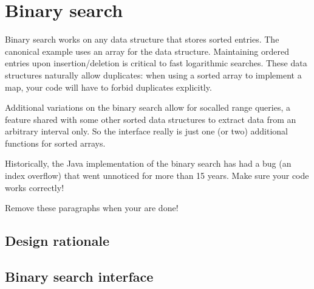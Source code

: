 \chapter{Binary search}\label{chap:binary:search}

Binary search works on any data structure that stores sorted entries. The canonical example uses an array for the data structure. Maintaining ordered entries upon insertion/deletion is critical to fast logarithmic searches. These data structures naturally allow duplicates: when using a sorted array to implement a map, your code will have to forbid duplicates explicitly.

Additional variations on the binary search allow for socalled range queries, a feature shared with some other sorted data structures to extract data from an arbitrary interval only. So the interface really is just one (or two) additional functions for sorted arrays.

Historically, the Java implementation of the binary search has had a bug (an index overflow) that went unnoticed for more than 15 years. Make sure your code works correctly!

Remove these paragraphs when your are done!

\section{Design rationale}

\section{Binary search interface}

